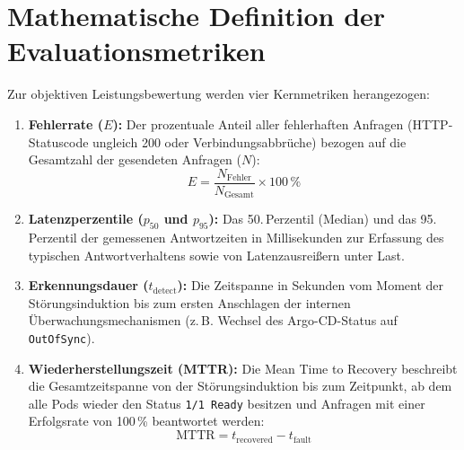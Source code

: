 \section{Mathematische Definition der Evaluationsmetriken}
\label{sec:definition-metriken}
Zur objektiven Leistungsbewertung werden vier Kernmetriken herangezogen:
\begin{enumerate}
    \item \textbf{Fehlerrate ($E$):} Der prozentuale Anteil aller fehlerhaften Anfragen (HTTP-Statuscode ungleich 200 oder Verbindungsabbrüche) bezogen auf die Gesamtzahl der gesendeten Anfragen ($N$):
    \begin{equation}
        E = \frac{N_{\text{Fehler}}}{N_{\text{Gesamt}}} \times 100\,\%
    \end{equation}
    \item \textbf{Latenzperzentile ($p_{50}$ und $p_{95}$):} Das 50.\,Perzentil (Median) und das 95.\,Perzentil der gemessenen Antwortzeiten in Millisekunden zur Erfassung des typischen Antwortverhaltens sowie von Latenzausreißern unter Last.
    \item \textbf{Erkennungsdauer ($t_{\text{detect}}$):} Die Zeitspanne in Sekunden vom Moment der Störungsinduktion bis zum ersten Anschlagen der internen Überwachungsmechanismen (z.\,B. Wechsel des Argo-CD-Status auf \texttt{OutOfSync}).
    \item \textbf{Wiederherstellungszeit (MTTR):} Die Mean Time to Recovery beschreibt die Gesamtzeitspanne von der Störungsinduktion bis zum Zeitpunkt, ab dem alle Pods wieder den Status \texttt{1/1 Ready} besitzen und Anfragen mit einer Erfolgsrate von 100\,\% beantwortet werden:
    \begin{equation}
        \text{MTTR} = t_{\text{recovered}} - t_{\text{fault}}
    \end{equation}
\end{enumerate}
